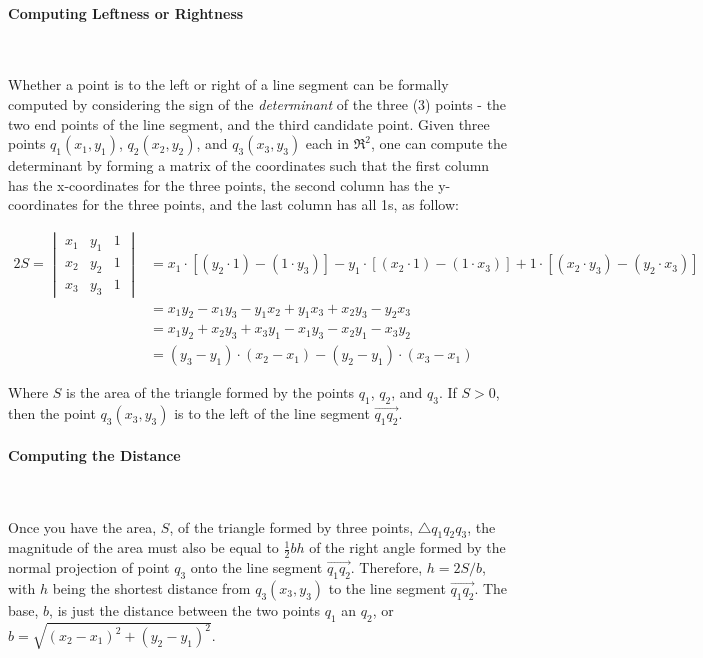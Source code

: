 \documentclass[letterpaper,10pt,english]{article}
\begin{document}
\paragraph{Computing Leftness or Rightness} ~

Whether a point is to the left or right of a line segment can be formally computed by considering the sign of the \emph{determinant} of the three (3) points - the two end points of the line segment, and the third candidate point. Given three points $q_{1}(x_{1}, y_{1})$, $q_{2}(x_{2},y_{2})$, and $q_{3}(x_{3},y_{3})$ each in $\Re^{2}$, one can compute the determinant by forming a matrix of the coordinates such that the first column has the x-coordinates for the three points, the second column has the y-coordinates for the three points, and the last column has all 1s, as follow:

\begin{align*}
 2S = \begin{vmatrix}
    x_{1} & y_{1} & 1 \\
    x_{2} & y_{2} & 1 \\
    x_{3} & y_{3} & 1
  \end{vmatrix}
  &= x_{1} \cdot [(y_{2} \cdot     1) - (1     \cdot y_{3})] - 
     y_{1} \cdot [(x_{2} \cdot     1) - (1     \cdot x_{3})] +
         1 \cdot [(x_{2} \cdot y_{3}) - (y_{2} \cdot x_{3})] \\
    &= x_{1}y_{2} - x_{1}y_{3} - y_{1}x_{2} + y_{1}x_{3} + x_{2}y_{3} - y_{2}x_{3} \\
    &= x_{1}y_{2} + x_{2}y_{3} + x_{3}y_{1} - x_{1}y_{3} - x_{2}y_{1} -x_{3}y_{2} \\
    &= (y_{3} - y_{1}) \cdot (x_{2} - x_{1}) - (y_{2} - y_{1}) \cdot (x_{3} - x_{1})
\end{align*}

Where $S$ is the area of the triangle formed by the points $q_{1}$, $q_{2}$, and $q_{3}$. If $S > 0$,  then the point $q_{3}(x_{3},y_{3})$ is to the left of the line segment $\overrightarrow{q_{1}q_{2}}$.

\paragraph{Computing the Distance} ~

Once you have the area, $S$, of the triangle formed by three points, $\triangle q_{1}q_{2}q_{3}$, the magnitude of the area must also be equal to $\frac{1}{2} b h$ of the right angle formed by the normal projection of point $q_{3}$ onto the line segment $\overrightarrow{q_{1}q_{2}}$. Therefore, $h = 2S/b$, with $h$ being the shortest distance from $q_{3}(x_{3},y_{3})$ to the line segment $\overrightarrow{q_{1}q_{2}}$. The base, $b$, is just the distance between the two points $q_{1}$ an $q_{2}$, or $b = \sqrt{(x_{2} - x_{1})^{2} + (y_{2} - y_{1})^{2}}$. 
\end{document}
